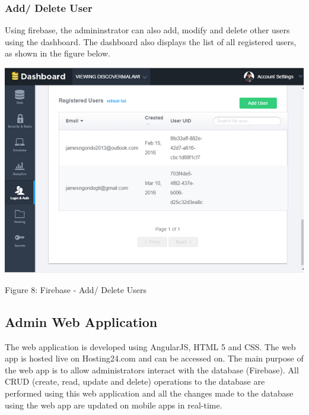 \paragraph{}
\subsubsection{Add/ Delete User}
Using firebase, the admininstrator can also add, modify and delete other users using the dashboard. The dashboard also displays the list of all registered users, as shown in the figure below.
\begin{center}    
	\includegraphics{img/delete_add.png}
\end{center}
\begin{center}
	Figure 8: Firebase - Add/ Delete Users
\end{center}

\paragraph{}
\subsection{Admin Web Application}
The web application is developed using AngularJS, HTML 5 and CSS. The web app is hosted live on Hosting24.com and can be accessed on\cite{hosting24}. The main purpose of the web app is to allow administrators interact with the database (Firebase). All CRUD (create, read, update and delete) operations to the database are performed using this web application and all the changes made to the database using the web app are updated on mobile apps in real-time. 

